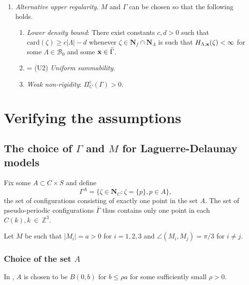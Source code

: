\begin{enumerate}[(\textbf{\^{U}})]
	\item \textit{Alternative upper regularity}. $M$ and $\Gamma$ can be chosen so that the following holds.
	\begin{enumerate}[(\^U1)]
		\item \textit{Lower density bound}: There exist constants $c,d > 0$ such that $\mathrm{card}(\zeta) \geq c|\Lambda| - d$ whenever $\zeta \in \mathbf N_f\cap\mathbf  N_\Lambda$ is such that $H_{\Lambda,{\mathbf{x}}}(\zeta)<\infty$ for some $\Lambda \in \mathcal B_0$ and some ${\mathbf{x}} \in \bar\Gamma$.
		\item = (U2) \textit{Uniform summability}.
		\item \textit{Weak non-rigidity}: $\Pi^z_C(\Gamma) > 0$.
	\end{enumerate}
\end{enumerate}






\section{Verifying the assumptions}

\subsection{The choice of $\Gamma$ and $M$ for Laguerre-Delaunay models}\label{sec:MGamma}
Fix some $A \subset C\times S$ and define
$$\Gamma^A = \{\zeta \in \mathbf N_C: \zeta = \{p\}, p \in A\},$$
the set of configurations consisting of exactly one point in the set $A$. The set of pseudo-periodic configurations $\bar\Gamma$ thus contains only one point in each $C(k), k~\in~\mathbb Z^3$.

Let $M$ be such that $|M_i| = a > 0$ for $i=1,2,3$ and $\angle(M_i,M_j) = \pi / 3$ for $i\neq j$.

\subsubsection{Choice of the set $A$}
In \cite{DDG12}, $A$ is chosen to be $B(0,b)$ for $b\leq \rho a$ for some sufficiently small $\rho >0$. 

